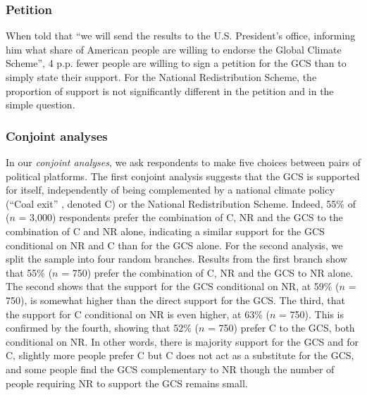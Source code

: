 \subsubsection{Petition} %
When told that ``we will send the results to the U.S. President's office, informing him what share of American people are willing to endorse the Global Climate Scheme'', 4 p.p. fewer people are willing to sign a petition for the GCS than to simply state their support. For the National Redistribution Scheme, the proportion of support is not significantly different in the petition and in the simple question. 

\subsubsection{Conjoint analyses} %
In our \textit{conjoint analyses}, we ask respondents to make five choices between pairs of political platforms. The first conjoint analysis suggests that the GCS is supported for itself, independently of being complemented by a national climate policy (``Coal exit''%
, denoted C) or the National Redistribution Scheme. Indeed, 55\% of ($n$ = 3,000) respondents prefer the combination of C, NR and the GCS to the combination of C and NR alone, indicating a similar support for the GCS conditional on NR and C than for the GCS alone.%
For the second analysis, we split the sample into four random branches. Results from the first branch show that 55\% ($n$ = 750) prefer the combination of C, NR and the GCS to NR alone. The second shows that the support for the GCS conditional on NR, at 59\% ($n$ = 750), is somewhat higher than the direct support for the GCS. The third, that the support for C conditional on NR is even higher, at 63\% ($n$ = 750). This is confirmed by the fourth, showing that 52\% ($n$ = 750) prefer C to the GCS, both conditional on NR. In other words, there is majority support for the GCS and for C, slightly more people prefer C but C does not act as a substitute for the GCS, and some people find the GCS complementary to NR though the number of people requiring NR to support the GCS remains small. %

